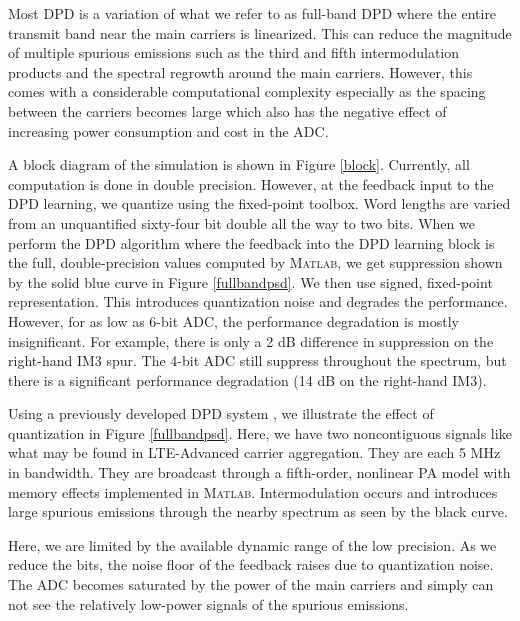 \documentclass[conference]{IEEEtran}
\begin{document}
Most DPD is a variation of what we refer to as full-band DPD where the entire transmit band near the main carriers is linearized. 
This can reduce the magnitude of multiple spurious emissions such as the third and fifth intermodulation products and the spectral regrowth around the main carriers. 
However, this comes with a considerable computational complexity especially as the spacing between the carriers becomes large \cite{TMTT_SubbandDPD} which also has the negative effect of increasing power consumption and cost in the ADC.

A block diagram of the simulation is shown in Figure \ref{block}. Currently, all computation is done in double precision. However, at the feedback input to the DPD learning, we quantize using the fixed-point toolbox. Word lengths are varied from an unquantified sixty-four bit double all the way to two bits. When we perform the DPD algorithm where the feedback into the DPD learning block is the full, double-precision values computed by \textsc{Matlab}, we get suppression shown by the solid blue curve in Figure \ref{fullbandpsd}. We then use signed, fixed-point representation. This introduces quantization noise and degrades the performance. However, for as low as 6-bit ADC, the performance degradation is mostly insignificant. For example, there is only a 2 dB difference in suppression on the right-hand IM3 spur. The 4-bit ADC still suppress throughout the spectrum, but there is a significant performance degradation (14 dB on the right-hand IM3). 

Using a previously developed DPD system \cite{Li2016GPU}, we illustrate the effect of quantization in Figure \ref{fullbandpsd}. 
Here, we have two noncontiguous signals like what may be found in LTE-Advanced carrier aggregation. They are each 5 MHz in bandwidth. 
They are broadcast through a fifth-order, nonlinear PA model with memory effects implemented in \textsc{Matlab}. 
Intermodulation occurs and introduces large spurious emissions through the nearby spectrum as seen by the black curve.

Here, we are limited by the available dynamic range of the low precision. 
As we reduce the bits, the noise floor of the feedback raises due to quantization noise. 
The ADC becomes saturated by the power of the main carriers and simply can not see the relatively low-power signals of the spurious emissions. 
\end{document}
